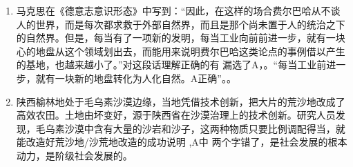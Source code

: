 \begin{enumerate}[align=hang, start=1]
	
	\item 
	马克思在《德意志意识形态》中写到：``因此，在这样的场合费尔巴哈从不谈人的世界，而是每次都求救于外部自然界，而且是那个尚未置于人的统治之下的自然界。但是，每当有了一项新的发明，每当工业向前前进一步，就有一块心的地盘从这个领域划出去，而能用来说明费尔巴哈这类论点的事例借以产生的基地，也越来越小了。''对这段话理解正确的有
	\note 漏选了A，。``每当工业前进一步，就有一块新的地盘转化为人化自然。A正确''。。
	
	\item 
	陕西榆林地处于毛乌素沙漠边缘，当地凭借技术创新，把大片的荒沙地改成了高效农田。土地由坏变好，源于陕西省在沙漠治理上的技术创新。研究人员发现，毛乌素沙漠中含有大量的沙岩和沙子，这两种物质只要比例调配得当，就能改造好荒沙地/沙荒地改造的成功说明
	\note {},A中  两个字错了，是社会发展的根本动力，是阶级社会发展的。
	
\end{enumerate}
